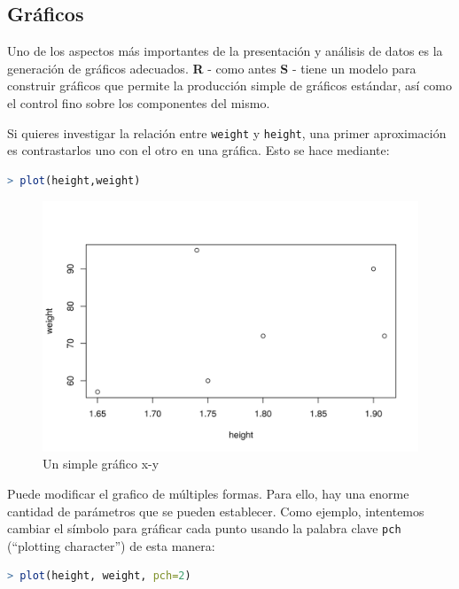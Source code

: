 \documentclass[spanish]{extbook}
\numberwithin{equation}{section}
\numberwithin{figure}{section}
\begin{document}
\subsection{Gráficos}

Uno de los aspectos más importantes de la presentación y análisis de datos es
la generación de gráficos adecuados. \textbf{R} - como antes \textbf{S} - tiene
un modelo para construir gráficos que permite la producción simple de gráficos
estándar, así como el control fino sobre los componentes del mismo. 

Si quieres investigar la relación entre  \texttt{weight} y \texttt{height}, una
primer aproximación es contrastarlos uno con el otro en una gráfica. Esto se
hace mediante:

\begin{lstlisting}[language=R]
> plot(height,weight)
\end{lstlisting}

\begin{figure}[H]
  \includegraphics[width=\linewidth]{fig-2.png}
  \caption{Un simple gráfico x-y}
  \label{fig:fig-2}
\end{figure}

Puede modificar el grafico de múltiples formas. Para ello, hay una enorme
cantidad de parámetros que se pueden establecer. Como ejemplo, intentemos
cambiar el símbolo para gráficar cada punto usando la palabra clave
\texttt{pch} (``plotting character'') de esta manera:

\begin{lstlisting}[language=R]
> plot(height, weight, pch=2)
\end{lstlisting}
\end{document}
